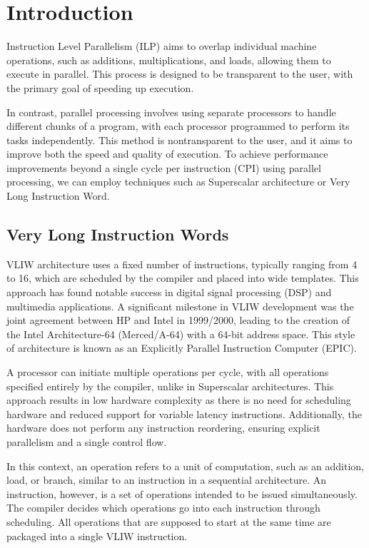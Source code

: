 \section{Introduction}

Instruction Level Parallelism (ILP) aims to overlap individual machine operations, such as additions, multiplications, and loads, allowing them to execute in parallel. 
This process is designed to be transparent to the user, with the primary goal of speeding up execution.

In contrast, parallel processing involves using separate processors to handle different chunks of a program, with each processor programmed to perform its tasks independently. 
This method is nontransparent to the user, and it aims to improve both the speed and quality of execution.
To achieve performance improvements beyond a single cycle per instruction (CPI) using parallel processing, we can employ techniques such as Superscalar architecture or Very Long Instruction Word.

\subsection{Very Long Instruction Words}
VLIW architecture uses a fixed number of instructions, typically ranging from 4 to 16, which are scheduled by the compiler and placed into wide templates. 
This approach has found notable success in digital signal processing (DSP) and multimedia applications.
A significant milestone in VLIW development was the joint agreement between HP and Intel in 1999/2000, leading to the creation of the Intel Architecture-64 (Merced/A-64) with a 64-bit address space. 
This style of architecture is known as an Explicitly Parallel Instruction Computer (EPIC).

A processor can initiate multiple operations per cycle, with all operations specified entirely by the compiler, unlike in Superscalar architectures. 
This approach results in low hardware complexity as there is no need for scheduling hardware and reduced support for variable latency instructions. 
Additionally, the hardware does not perform any instruction reordering, ensuring explicit parallelism and a single control flow.

In this context, an operation refers to a unit of computation, such as an addition, load, or branch, similar to an instruction in a sequential architecture. 
An instruction, however, is a set of operations intended to be issued simultaneously. 
The compiler decides which operations go into each instruction through scheduling. 
All operations that are supposed to start at the same time are packaged into a single VLIW instruction.

